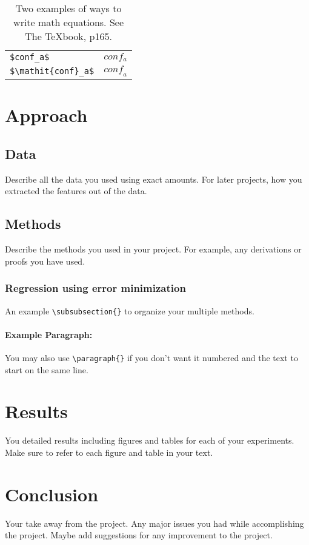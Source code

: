 \documentclass[12pt,twoside,a4paper]{article}
\begin{document}
\begin{table}\centering
\begin{tabular}{ll}
 \verb'$conf_a$' &  $conf_a$ \\
 \verb'$\mathit{conf}_a$' & $\mathit{conf}_a$
\end{tabular}
\caption{Two examples of ways to write math equations.  See The \TeX book, p165. \label{tab:math}}
\end{table}


\section{Approach}
\subsection{Data}
Describe all the data you used using exact amounts.  For later projects, how you extracted the features out of the data. 
\subsection{Methods}
Describe the methods you used in your project.  For example, any derivations or proofs you have used.
\subsubsection{Regression using error minimization }
An example \verb'\subsubsection{}' to organize your multiple methods.  
\paragraph{Example Paragraph:} You may also use \verb'\paragraph{}' if you don't want it numbered and the text to start on the same line.
\section{Results}
You detailed results including figures and tables for each of your experiments.  Make sure to refer to each figure and table in your text.
\section{Conclusion}
Your take away from the project.  Any major issues you had while accomplishing the project.  Maybe add suggestions for any improvement to the project.
{\small

}
\end{document}
